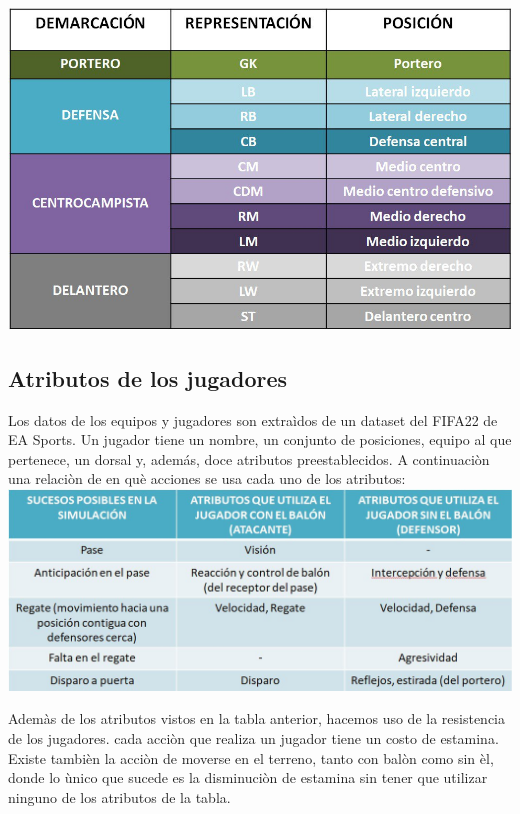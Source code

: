 \documentclass{article}
\begin{document}
\includegraphics*[width=1\textwidth]{tabla_informe.jpg}


    \subsection{Atributos de los jugadores}
Los datos de los equipos y jugadores son extraìdos de un dataset del FIFA22 de EA Sports. Un jugador tiene un nombre, un conjunto de posiciones, equipo al que pertenece, un dorsal y, además, doce atributos preestablecidos. A continuaciòn una relaciòn de en què acciones se usa cada uno de los atributos:\\

\includegraphics*[width=1\textwidth]{tabla_atributos.jpg}
\bigskip

Ademàs de los atributos vistos en la tabla anterior, hacemos uso de la resistencia de los jugadores. cada acciòn que realiza un jugador tiene un costo de estamina. Existe tambièn la acciòn de moverse en  el terreno, tanto con balòn como sin èl, donde lo ùnico que sucede es la disminuciòn de estamina sin tener que utilizar ninguno de los atributos de la tabla.\\ 
\end{document}
